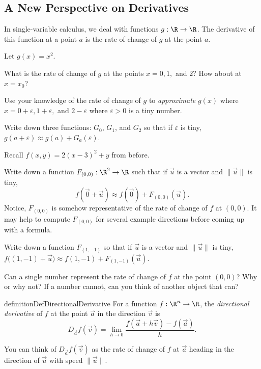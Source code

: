 \subsection*{A New Perspective on Derivatives}

	In single-variable calculus, we deal with functions $g:\R\to\R$.  The derivative of this function
	at a point $a$ is the rate of change of $g$ at the point $a$.

\begin{question}
	Let $g(x)=x^2$.
	\begin{parts}
		\item What is the rate of change of $g$ at the points $x=0,1,$ and $2$?  How about at $x=x_0$?
		\item Use your knowledge of the rate of change of $g$ to \emph{approximate} $g(x)$ where
			$x=0+\varepsilon, 1+\varepsilon,$ and $2-\varepsilon$ where $\varepsilon>0$ is a tiny number.
		\item Write down three functions: $G_0$, $G_1$, and $G_2$ so that if $\varepsilon$ is tiny, $g(a+\varepsilon)\approx
			g(a) + G_a(\varepsilon)$.  
	\end{parts}
\end{question}

\begin{question}
	Recall $f(x,y)=2(x-3)^2+y$ from before.
	\begin{parts}
		\item Write down a function $F_{(0,0)}:\R^2\to\R$ such that if $\vec u$ is a vector
			and $\|\vec u\|$ is tiny, 
			\[
				f(\vec 0+\vec u)\approx f(\vec 0) + F_{(0,0)}(\vec u).
			\]
			Notice, $F_{(0,0)}$ is somehow representative of the rate of change of $f$ at $(0,0)$.
			It may help to compute $F_{(0,0)}$ for several example directions before coming up
			with a formula.
		\item Write down a function $F_{(1,-1)}$ so that if $\vec u$ is a vector and $\|\vec u\|$ is
			tiny, $f\Big((1,-1)+\vec u\Big)\approx f(1,-1)+F_{(1,-1)}(\vec u)$.
		\item Can a single number represent the rate of change of $f$ at the point $(0,0)$?  Why or why not?
			If a number cannot, can you think of another object that can?
	\end{parts}
\end{question}

\begin{restatable*}{definition}{DefDirectionalDerivative}
	For a function $f:\R^n\to\R$, the \emph{directional derivative} of $f$ at the point $\vec a$
	in the direction $\vec v$ is
	\[
		D_{\vec a}f(\vec v) = \lim_{h\to0}\frac{f(\vec a+h\vec v)-f(\vec a)}{h}.
	\]
\end{restatable*}
		You can think of $D_{\vec a}f(\vec v)$ as the rate of change of $f$ at 
		$\vec a$ heading in the direction of $\vec u$
		with speed $\|\vec u\|$.

